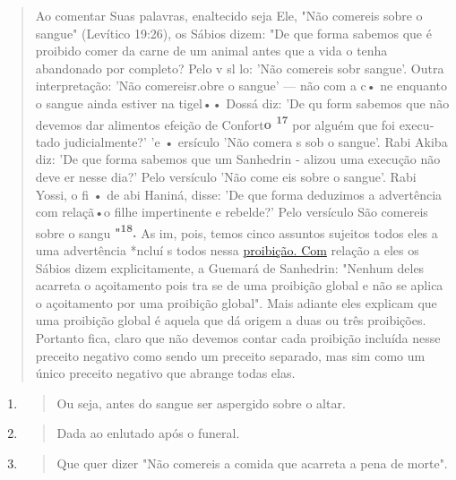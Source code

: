 \begin{quote}
Ao comentar Suas palavras, enaltecido seja Ele, "Não comereis so­bre o
sangue" (Levítico 19:26), os Sábios dizem: "De que forma sabemos que é
proibido comer da carne de um animal antes que a vida o tenha abandonado
por completo? Pelo v sl lo: 'Não comereis sobr sangue'. Outra
interpre­tação: 'Não comereisr.obre o sangue' --- não com a c• ne
enquanto o sangue ainda estiver na tigel•• Dossá diz: 'De qu form
sabemos que não de­vemos dar alimentos efeição de Confort\textbf{o
\textsuperscript{17}} por alguém que foi execu­tado judicialmente?' 'e •
ersículo 'Não comera s sob o sangue'. Rabi Akiba diz: 'De que forma
sabemos que um Sanhedrin - alizou uma execução não deve er nesse dia?'
Pelo versículo 'Não come eis sobre o sangue'. Rabi Yossi, o fi • de abi
Haniná, disse: 'De que forma deduzimos a advertência com rela­çã•o filhe
impertinente e rebelde?' Pelo versículo São comereis sobre o san­gu
\textbf{"\textsuperscript{18}.} As im, pois, temos cinco assuntos
sujeitos todos eles a uma advertên­cia *ncluí s todos nessa
\href{http://proibição.Com}{{proibição. Com}} relação a eles os Sábios
dizem expli­citamente, a Guemará de Sanhedrin: "Nenhum deles acarreta o
açoitamento pois tra se de uma proibição global e não se aplica o
açoitamento por uma proibição global". Mais adiante eles explicam que
uma proibição global é aque­la que dá origem a duas ou três proibições.
Portanto fica, claro que não deve­mos contar cada proibição incluída
nesse preceito negativo como sendo um preceito separado, mas sim como um
único preceito negativo que abrange to­das elas.
\end{quote}

\begin{enumerate}
\def\labelenumi{\arabic{enumi}.}
\setcounter{enumi}{15}
\item
  \begin{quote}
  Ou seja, antes do sangue ser aspergido sobre o altar.
  \end{quote}
\item
  \begin{quote}
  Dada ao enlutado após o funeral.
  \end{quote}
\item
  \begin{quote}
  Que quer dizer "Não comereis a comida que acarreta a pena de morte".
  \end{quote}
\end{enumerate}


